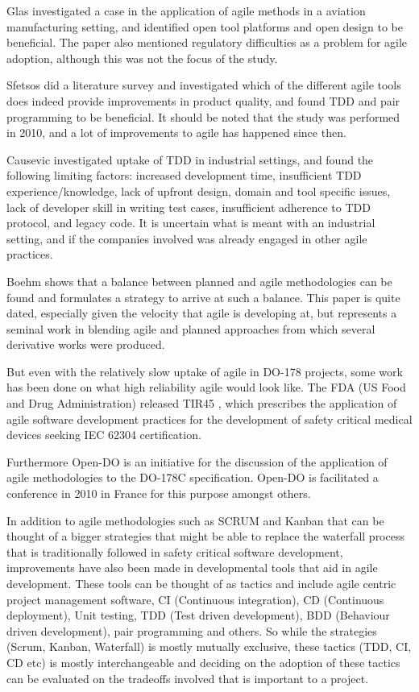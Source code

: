 \documentclass{sig-alternate-05-2015}
\begin{document}
Glas \cite{Glas_2009} investigated a case in the application of agile methods in a aviation manufacturing setting, and identified open tool platforms and open design to be beneficial. The paper also mentioned regulatory difficulties as a problem for agile adoption, although this was not the focus of the study.  

Sfetsos \cite{Sfetsos_2010} did a literature survey and investigated which of the different agile tools does indeed provide improvements in product quality, and found TDD and pair programming to be beneficial. It should be noted that the study was performed in 2010, and a lot of improvements to agile has happened since then.

Causevic \cite{Causevic_2011} investigated uptake of TDD in industrial settings, and found the following limiting factors: increased development time, insufficient TDD experience/knowledge, lack of upfront design, domain and tool specific issues, lack of developer skill in writing test cases, insufficient adherence to TDD protocol, and legacy code. It is uncertain what is meant with an industrial setting, and if the companies involved was already engaged in other agile practices. 
 
Boehm \cite{Boehm_2003} shows that a balance between planned and agile methodologies can be found and formulates a strategy to arrive at such a balance. This paper is quite dated, especially given the velocity that agile is developing at, but represents a seminal work in blending agile and planned approaches from which several derivative works were produced. 

But even with the relatively slow uptake of agile in DO-178 projects, some work has been done on what high reliability agile would look like. The FDA (US Food and Drug Administration) released TIR45 \cite{AAMI_TIR45_2012}, which prescribes the application of agile software development practices for the development of safety critical medical devices seeking IEC 62304 certification. 

Furthermore Open-DO \cite{OPEN-DO_2010} is an initiative for the discussion of the application of agile methodologies to the DO-178C specification. Open-DO is facilitated a conference in 2010 in France for this purpose amongst others. 

In addition to agile methodologies such as SCRUM and Kanban that can be thought of a bigger strategies that might be able to replace the waterfall process that is traditionally followed in safety critical software development, improvements have also been made in developmental tools that aid in agile development. These tools can be thought of as tactics and include agile centric project management software, CI (Continuous integration), CD (Continuous deployment), Unit testing, TDD (Test driven development), BDD (Behaviour driven development), pair programming and others. So while the strategies (Scrum, Kanban, Waterfall) is mostly mutually exclusive, these tactics (TDD, CI, CD etc) is mostly interchangeable and deciding on the adoption of these tactics can be evaluated on the tradeoffs involved that is important to a project.    
\end{document}
